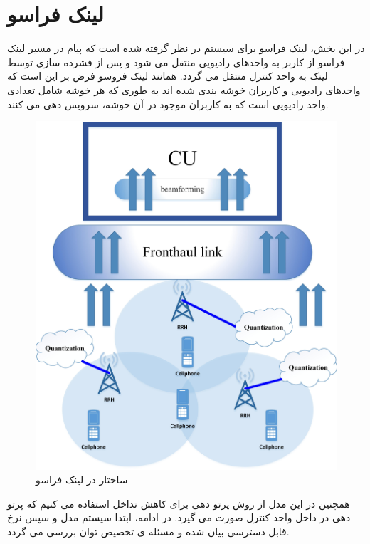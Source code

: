 \section{لینک فراسو}
در این بخش، لینک فراسو برای سیستم  در نظر گرفته شده است که  پیام در مسیر لینک فراسو از کاربر به واحدهای رادیویی منتقل می شود و پس از فشرده سازی توسط لینک  به واحد کنترل منتقل می گردد. \newline
همانند لینک فروسو فرض بر این است که واحدهای رادیویی و کاربران خوشه بندی شده اند به طوری که هر خوشه  شامل تعدادی واحد رادیویی است که به کاربران موجود در آن خوشه، سرویس دهی می کنند.

 \begin{figure}
  \centering
    \includegraphics[scale = 0.45]{./fig/Drawing2}
  \caption{ساختار 
  در  لینک فراسو
  }
  \label{fig:cr2}
\end{figure}
همچنین در این مدل از روش پرتو دهی برای کاهش تداخل استفاده می کنیم که پرتو دهی در داخل واحد کنترل صورت می گیرد.
در ادامه، ابتدا سیستم  مدل و سپس نرخ قابل دسترسی بیان شده و مسئله ی تخصیص توان بررسی می گردد.
